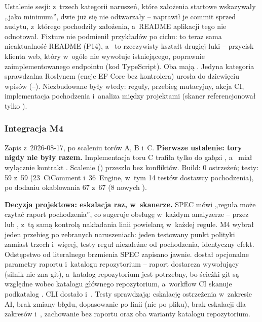 Ustalenie sesji: z~trzech kategorii naruszeń, które założenia startowe wskazywały „jako
minimum”, dwie już się nie odtwarzały -- naprawił je commit sprzed audytu, z~którego
pochodziły założenia, a~README aplikacji tego nie odnotował. Fixture nie podmienił
przykładów po cichu:  to teraz sama nieaktualność README (P14),
a~ to rzeczywisty kształt drugiej luki -- przycisk klienta web, który
w~ogóle nie wywołuje istniejącego, poprawnie zaimplementowanego endpointu (kod TypeScript). Oba mają
. Jedyna kategoria sprawdzalna Roslynem (encje EF Core bez
kontrolera) urosła do dziewięciu wpisów (--).
Niezbudowane były wtedy: reguły, przebieg mutacyjny, akcja CI, implementacja pochodzenia
i~analiza między projektami (skaner referencjonował tylko ).

\subsubsection{Integracja M4}\label{sec:portcullis-m4}

Zapis z~2026-08-17, po scaleniu torów A, B i~C. \textbf{Pierwsze ustalenie: tory nigdy nie
były razem.} Implementacja  toru C trafiła tylko do gałęzi
, a~ miał wyłącznie kontrakt
. Scalenie () przeszło bez
konfliktów. Build: 0 ostrzeżeń; testy: 59 z~59 (23~CiComment i~36~Engine, w~tym 14 testów
dostawcy pochodzenia), po dodaniu okablowania 67 z~67 (8 nowych
).

\textbf{Decyzja projektowa: eskalacja raz, w~skanerze.} SPEC mówi „reguła może czytać
raport pochodzenia”, co sugeruje obsługę w~każdym analyzerze -- przez
 lub , z~tą samą kontrolą nakładania
linii powielaną w~każdej regule. M4 wybrał jeden przebieg po zebranych naruszeniach:
jeden testowany punkt polityki zamiast trzech i~więcej, testy reguł niezależne od pochodzenia,
identyczny efekt. Odstępstwo od literalnego brzmienia SPEC zapisano jawnie.
 dostał opcjonalne parametry raportu i~katalogu repozytorium --
raport dostarcza wywołujący (silnik nie zna git), a~katalog repozytorium jest potrzebny, bo
ścieżki git są względne wobec katalogu głównego repozytorium, a~workflow CI skanuje
podkatalog . CLI dostało 
i~. Testy sprawdzają: eskalację ostrzeżenia w~zakresie AI,
brak zmiany błędu, dopasowanie po linii (nie po pliku), brak eskalacji dla zakresów
 i~, zachowanie bez raportu oraz oba warianty katalogu
repozytorium.

